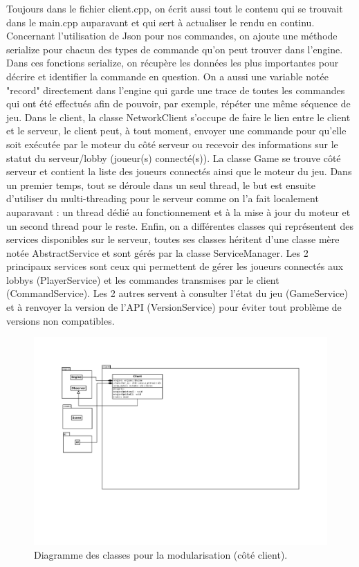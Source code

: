 \documentclass[a4paper,12pt]{article}
\begin{document}
Toujours dans le fichier client.cpp, on écrit aussi tout le contenu qui se trouvait dans le main.cpp auparavant et qui sert à actualiser le rendu en continu.
\bigbreak
Concernant l'utilisation de Json pour nos commandes, on ajoute une méthode serialize pour chacun des types de commande qu'on peut trouver dans l'engine. Dans ces fonctions serialize, on récupère les données les plus importantes pour décrire et identifier la commande en question.
On a aussi une variable notée "record" directement dans l'engine qui garde une trace de toutes les commandes qui ont été effectués afin de pouvoir, par exemple, répéter une même séquence de jeu.
\bigbreak
Dans le client, la classe NetworkClient s'occupe de faire le lien entre le client et le serveur, le client peut, à tout moment, envoyer une commande pour qu'elle soit exécutée par le moteur du côté serveur ou recevoir des informations sur le statut du serveur/lobby (joueur(s) connecté(s)).
\bigbreak
La classe Game se trouve côté serveur et contient la liste des joueurs connectés ainsi que le moteur du jeu. Dans un premier temps, tout se déroule dans un seul thread, le but est ensuite d'utiliser du multi-threading pour le serveur comme on l'a fait localement auparavant : un thread dédié au fonctionnement et à la mise à jour du moteur et un second thread pour le reste.
\bigbreak
Enfin, on a différentes classes qui représentent des services disponibles sur le serveur, toutes ses classes héritent d'une classe mère notée AbstractService et sont gérés par la classe ServiceManager.
Les 2 principaux services sont ceux qui permettent de gérer les joueurs connectés aux lobbys (PlayerService) et les commandes transmises par le client (CommandService).
Les 2 autres servent à consulter l'état du jeu (GameService) et à renvoyer la version de l'API (VersionService) pour éviter tout problème de versions non compatibles.

\begin{landscape}
\begin{figure}[p]
\includegraphics[width=0.9\paperheight]{client.pdf}
\caption{\label{moduleC}Diagramme des classes pour la modularisation (côté client).} 
\end{figure}
\end{landscape}
\end{document}
